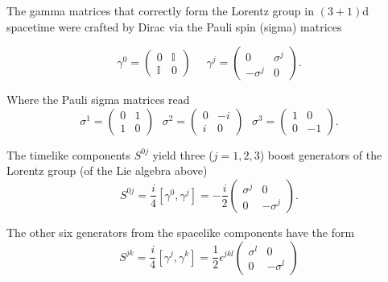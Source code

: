 \noindent The gamma matrices that correctly form the Lorentz group in $(3+1)$d spacetime were crafted by Dirac via the Pauli spin (sigma) matrices

\begin{equation}
\gamma^0 = \left( \begin{array}{c|c} 0 & \mathbb{I} \\ \hline \mathbb{I} & 0 \end{array} \right) \,\,\,\,\,\,\,\, \gamma^j = \left( \begin{array}{c|c} 0 & \sigma^j \\ \hline -\sigma^j & 0 \end{array} \right) .
\end{equation}

\noindent Where the Pauli sigma matrices read
\begin{equation}
\sigma^1 = \left( \begin{array}{cc} 0 & 1 \\ 1 & 0 \end{array} \right) \,\,\,\, \sigma^2 = \left( \begin{array}{cc} 0 & -i \\ i & 0 \end{array} \right) \,\,\,\, \sigma^3 = \left( \begin{array}{cc} 1 & 0 \\ 0 & -1 \end{array} \right) .
\end{equation}

\noindent The timelike components $S^{0j}$ yield three ($j=1,2,3$) boost generators of the Lorentz group (of the Lie algebra above)
\begin{equation}
S^{0j} = \frac{i}{4} \left[ \gamma^0, \gamma^j \right] = -\frac{i}{2} \left(\begin{array}{cc} \sigma^j & 0 \\ 0 & -\sigma^j \end{array} \right) .
\end{equation}

\noindent The other six generators from the spacelike components have the form
\begin{equation}
S^{jk} = \frac{i}{4} \left[ \gamma^j, \gamma^k \right] = \frac{1}{2} \epsilon^{jkl} \left(\begin{array}{cc} \sigma^l & 0 \\ 0 & -\sigma^l \end{array} \right)
\end{equation}

